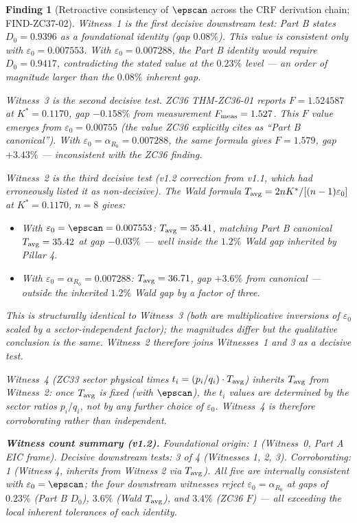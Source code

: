 \documentclass[12pt, a4paper]{article}
\newtheorem{finding}{Finding}[section]
\begin{document}
\begin{finding}[Retroactive consistency of $\epscan$ across
  the CRF derivation chain; FIND-ZC37-02]
Witness~1 is the first decisive downstream test: Part B
states $D_0 = 0.9396$ as a foundational identity (gap
$0.08\%$). This value is consistent only with
$\varepsilon_0 = 0.007553$. With $\varepsilon_0 = 0.007288$,
the Part B identity would require $D_0 = 0.9417$, contradicting
the stated value at the $0.23\%$ level --- an order of magnitude
larger than the $0.08\%$ inherent gap.

Witness~3 is the second decisive test. ZC36 THM-ZC36-01 reports
$F = 1.524587$ at $K^* = 0.1170$, gap $-0.158\%$ from
measurement $F_{\rm meas} = 1.527$. This $F$ value emerges from
$\varepsilon_0 = 0.00755$ (the value ZC36 explicitly cites as
``Part B canonical''). With $\varepsilon_0 = \alpha_{R_0} =
0.007288$, the same formula gives $F = 1.579$, gap $+3.43\%$
--- inconsistent with the ZC36 finding.

Witness~2 is the \emph{third decisive test} (v1.2 correction
from v1.1, which had erroneously listed it as non-decisive).
The Wald formula $T_{\rm avg} = 2nK^*/[(n-1)\varepsilon_0]$
at $K^* = 0.1170$, $n = 8$ gives:
\begin{itemize}[leftmargin=*, noitemsep]
  \item With $\varepsilon_0 = \epscan = 0.007553$:
    $T_{\rm avg} = 35.41$, matching Part B canonical
    $T_{\rm avg} = 35.42$ at gap $-0.03\%$ --- well inside
    the $1.2\%$ Wald gap inherited by Pillar 4.
  \item With $\varepsilon_0 = \alpha_{R_0} = 0.007288$:
    $T_{\rm avg} = 36.71$, gap $+3.6\%$ from canonical ---
    \emph{outside} the inherited $1.2\%$ Wald gap by a
    factor of three.
\end{itemize}
This is structurally identical to Witness~3 (both are
multiplicative inversions of $\varepsilon_0$ scaled by a
sector-independent factor); the magnitudes differ but the
qualitative conclusion is the same. Witness~2 therefore
joins Witnesses~1 and 3 as a decisive test.

Witness~4 (ZC33 sector physical times $t_i = (p_i/q_i)
\cdot T_{\rm avg}$) inherits $T_{\rm avg}$ from Witness~2:
once $T_{\rm avg}$ is fixed (with $\epscan$), the $t_i$
values are determined by the sector ratios $p_i/q_i$, not
by any further choice of $\varepsilon_0$. Witness~4 is
therefore corroborating rather than independent.

\medskip
\textbf{Witness count summary (v1.2).}
Foundational origin: 1 (Witness~0, Part A EIC frame).
Decisive downstream tests: 3 of 4 (Witnesses 1, 2, 3).
Corroborating: 1 (Witness 4, inherits from Witness 2 via
$T_{\rm avg}$). All five are internally consistent with
$\varepsilon_0 = \epscan$; the four downstream witnesses
reject $\varepsilon_0 = \alpha_{R_0}$ at gaps of $0.23\%$
(Part B $D_0$), $3.6\%$ (Wald $T_{\rm avg}$), and $3.4\%$
(ZC36 $F$) --- all exceeding the local inherent tolerances of
each identity.


\end{finding}
\end{document}
